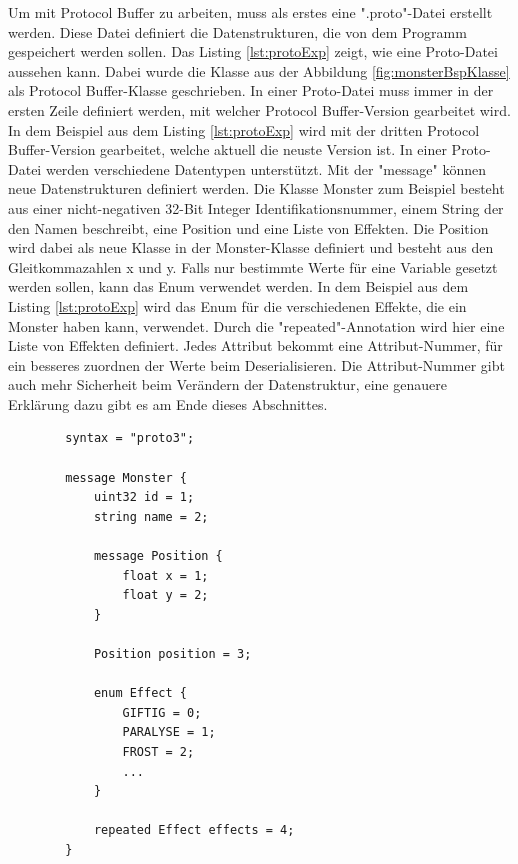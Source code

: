 Um mit Protocol Buffer zu arbeiten, muss als erstes eine ".proto"-Datei erstellt werden. Diese Datei definiert die Datenstrukturen, die von dem Programm gespeichert werden sollen. Das Listing \ref{lst:protoExp} zeigt, wie eine Proto-Datei aussehen kann. Dabei wurde die Klasse aus der Abbildung \ref{fig:monsterBspKlasse} als Protocol Buffer-Klasse geschrieben. In einer Proto-Datei muss immer in der ersten Zeile definiert werden, mit welcher Protocol Buffer-Version gearbeitet wird. In dem Beispiel aus dem Listing \ref{lst:protoExp} wird mit der dritten Protocol Buffer-Version gearbeitet, welche aktuell die neuste Version ist. In einer Proto-Datei werden verschiedene Datentypen unterstützt. Mit der "message" können neue Datenstrukturen definiert werden. Die Klasse Monster zum Beispiel besteht aus einer nicht-negativen 32-Bit Integer Identifikationsnummer, einem String der den Namen beschreibt, eine Position und eine Liste von Effekten. Die Position wird dabei als neue Klasse in der Monster-Klasse definiert und besteht aus den Gleitkommazahlen x und y. Falls nur bestimmte Werte für eine Variable gesetzt werden sollen, kann das Enum verwendet werden. In dem Beispiel aus dem Listing \ref{lst:protoExp} wird das Enum für die verschiedenen Effekte, die ein Monster haben kann, verwendet. Durch die "repeated"-Annotation wird hier eine Liste von Effekten definiert. Jedes Attribut bekommt eine Attribut-Nummer, für ein besseres zuordnen der Werte beim Deserialisieren.\cite{protobufLanguageGuide}\cite{protobufProtocolBufferJava} Die Attribut-Nummer gibt auch mehr Sicherheit beim Verändern der Datenstruktur, eine genauere Erklärung dazu gibt es am Ende dieses Abschnittes. 

\begin{listing}[htp]
    \begin{verbatim} 
        syntax = "proto3";
        
        message Monster {
            uint32 id = 1;
            string name = 2;

            message Position {
                float x = 1;
                float y = 2;
            }

            Position position = 3;

            enum Effect {
                GIFTIG = 0;
                PARALYSE = 1;
                FROST = 2;
                ...
            }

            repeated Effect effects = 4;
        }
    \end{verbatim}
    \caption{Proto-Datei einer Monster-Klasse}
    \label{lst:protoExp}
\end{listing}

